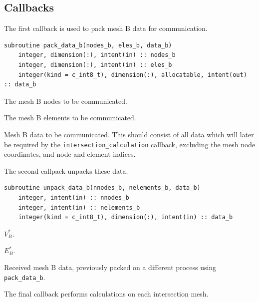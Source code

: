 \documentclass{article}
\begin{document}
\subsection{Callbacks}\label{sect:parallel_callbacks}

\noindent The first callback is used to pack mesh B data for communication.

\begin{lstlisting}[language=FORTRAN]
  subroutine pack_data_b(nodes_b, eles_b, data_b)
    integer, dimension(:), intent(in) :: nodes_b
    integer, dimension(:), intent(in) :: eles_b
    integer(kind = c_int8_t), dimension(:), allocatable, intent(out) :: data_b
\end{lstlisting}

\begin{description}[font=\ttfamily\bfseries,leftmargin=2.2\parindent,labelindent=1.7\parindent,noitemsep]
  \item[nodes\_b] The mesh B nodes to be communicated.
  \item[eles\_b] The mesh B elements to be communicated.
  \item[data\_b] Mesh B data to be communicated. This should consist of all
    data which will later be required by the \verb+intersection_calculation+
    callback, excluding the mesh node coordinates, and node and element indices.
\end{description}

\noindent The second callpack unpacks these data.

\begin{lstlisting}[language=FORTRAN]
  subroutine unpack_data_b(nnodes_b, nelements_b, data_b)
    integer, intent(in) :: nnodes_b
    integer, intent(in) :: nelements_b
    integer(kind = c_int8_t), dimension(:), intent(in) :: data_b
\end{lstlisting}

\begin{description}[font=\ttfamily\bfseries,leftmargin=2.2\parindent,labelindent=1.7\parindent,noitemsep]
  \item[nodes\_b] $V_B^*$.
  \item[eles\_b] $E_B^*$.
  \item[data\_b] Received mesh B data, previously packed on a different process
    using \verb+pack_data_b+.
\end{description}

\noindent The final callback performs calculations on each intersection mesh.
      
\end{document}
